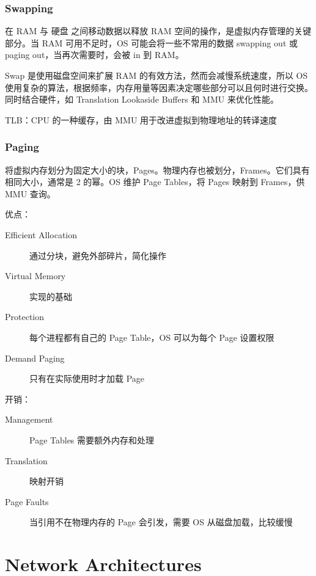 \documentclass[11pt,journal,compsoc]{IEEEtran}
\begin{document}
\subsubsection{Swapping}

在 RAM 与 硬盘 之间移动数据以释放 RAM 空间的操作，是虚拟内存管理的关键部分。当 RAM 可用不足时，OS 可能会将一些不常用的数据 swapping out 或 paging out，当再次需要时，会被 in 到 RAM。

Swap 是使用磁盘空间来扩展 RAM 的有效方法，然而会减慢系统速度，所以 OS 使用复杂的算法，根据频率，内存用量等因素决定哪些部分可以且何时进行交换。同时结合硬件，如 Translation Lookaside Buffers 和 MMU 来优化性能。

TLB：CPU 的一种缓存，由 MMU 用于改进虚拟到物理地址的转译速度


\subsubsection{Paging}

将虚拟内存划分为固定大小的块，Pages。物理内存也被划分，Frames。它们具有相同大小，通常是 2 的幂。OS 维护 Page Tables，将 Pages 映射到 Frames，供 MMU 查询。

优点：

\begin{description}
    \item[Efficient Allocation] 通过分块，避免外部碎片，简化操作

    \item[Virtual Memory] 实现的基础

    \item[Protection] 每个进程都有自己的 Page Table，OS 可以为每个 Page 设置权限

    \item[Demand Paging] 只有在实际使用时才加载 Page
\end{description}

开销：

\begin{description}
    \item[Management] Page Tables 需要额外内存和处理

    \item[Translation] 映射开销

    \item[Page Faults] 当引用不在物理内存的 Page 会引发，需要 OS 从磁盘加载，比较缓慢
\end{description}


\section{Network Architectures}
\end{document}
